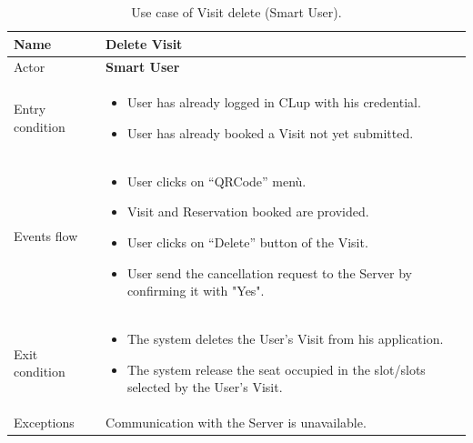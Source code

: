 \begin{table}[H]\begin{tabular}{|p{5cm} | p{7cm} | }
	\hline
	Name & \textbf{Delete Visit} \\
	\hline
	Actor & \textbf{Smart User} \\
	\hline
	Entry condition &
	\begin{itemize}
		\item User has already logged in CLup with his credential. 
		\item User has already booked a Visit not yet submitted. 
	\end{itemize} \\
	\hline
	Events flow & 
	\begin{itemize}
		\item User clicks on “QRCode” menù.
		\item Visit and Reservation booked are provided.
		\item User clicks on “Delete” button of the Visit.
		\item User send the cancellation request to the Server by confirming it with "Yes".
	\end{itemize} \\
	\hline
	Exit condition &
	\begin{itemize}	
		\item The system deletes the User's Visit from his application.
		\item The system release the seat occupied in the slot/slots selected by the User's Visit.
	\end{itemize} \\
	\hline 
	Exceptions & Communication with the Server is unavailable. \\ 
	\hline
\end{tabular}
\caption{Use case of Visit delete (Smart User).}

\end{table}

\bigbreak


